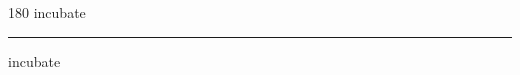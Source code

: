 
\begin{frame}
\begin{center}
\begin{turn}{180}
{\fontsize{2.5cm}{1em}\selectfont incubate}
\end{turn}
\vspace{1em}\par  
\hrule
\vspace{1em}\par  
{\fontsize{2.5cm}{1em}\selectfont incubate}
\end{center}
\end{frame}
